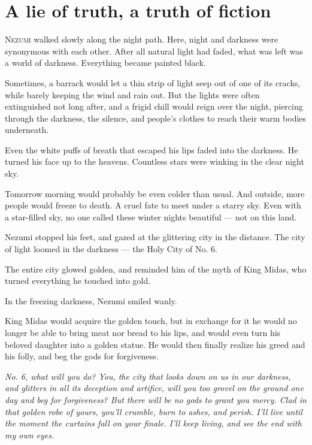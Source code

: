 
\chapter{A lie of truth, a truth of fiction}


\lettrine{N}{ezumi} walked slowly along the night path. Here, night and darkness were
synonymous with each other. After all natural light had faded, what was
left was a world of darkness. Everything became painted black.

Sometimes, a barrack would let a thin strip of light seep out of one of
its cracks, while barely keeping the wind and rain out. But the lights
were often extinguished not long after, and a frigid chill would reign
over the night, piercing through the darkness, the silence, and people's
clothes to reach their warm bodies underneath.~

Even the white puffs of breath that escaped his lips faded into the
darkness. He turned his face up to the heavens. Countless stars were
winking in the clear night sky.

Tomorrow morning would probably be even colder than usual. And outside,
more people would freeze to death. A cruel fate to meet under a starry
sky. Even with a star-filled sky, no one called these winter nights
beautiful --- not on this land.

Nezumi stopped his feet, and gazed at the glittering city in the
distance. The city of light loomed in the darkness --- the Holy City of
No. 6.

The entire city glowed golden, and reminded him of the myth of King
Midas, who turned everything he touched into gold.

In the freezing darkness, Nezumi smiled wanly.

King Midas would acquire the golden touch, but in exchange for it he
would no longer be able to bring meat nor bread to his lips, and would
even turn his beloved daughter into a golden statue. He would then
finally realize his greed and his folly, and beg the gods for
forgiveness.

\emph{No. 6, what will you do? You, the city that looks down on us in our
darkness, and glitters in all its deception and artifice, will you too
grovel on the ground one day and beg for forgiveness? But there will be
no gods to grant you mercy. Clad in that golden robe of yours, you'll
crumble, burn to ashes, and perish. I'll live until the moment the
curtains fall on your finale. I'll keep living, and see the end with my
own eyes.}

